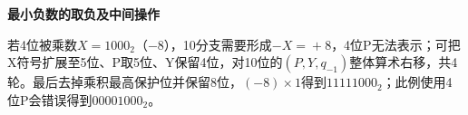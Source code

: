 {\color{ink}\bfseries 最小负数的取负及中间操作}\par\vspace{1bp}若4位被乘数\(X=\allowbreak{}1000_{2}\)（\(-\)8），10分支需要形成\(-X=\allowbreak{}+\allowbreak{}8\)，4位P无法表示；可把X符号扩展至5位、P取5位、Y保留4位，对10位的\((P,\allowbreak{}Y,\allowbreak{}q_{-1})\)整体算术右移，共4轮。最后去掉乘积最高保护位并保留8位，\((-8)\times 1\)得到\(1111 1000_{2}\)；此例使用4位P会错误得到\(0000 1000_{2}\)。
